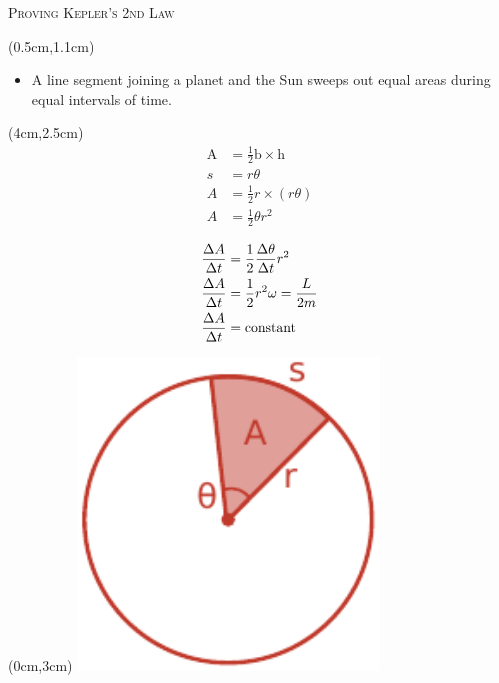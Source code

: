 \documentclass[9pt]{beamer}
\begin{document}
    \begin{frame}{\textsc{Proving Kepler's 2nd Law}}
        \centering
        \begin{textblock*}{10.5cm}(0.5cm,1.1cm)
            \begin{itemize}
                \item A line segment joining a planet and the Sun sweeps out equal areas during equal intervals of time.
            \end{itemize}
        \end{textblock*}

        \begin{textblock*}{10.5cm}(4cm,2.5cm)
            \centering
            \begin{align*}
                \text{A} &= \frac{1}{2}\text{b}\times\text{h} \\        
                s &= r\theta \\
                A&=\frac{1}{2}r\times\left(r\theta\right) \\          
                A&=\frac12 \theta r^2 \\
            \end{align*}
            \begin{align*}
                \frac{\Delta A}{\Delta t} &= \frac{1}{2}\frac{\Delta \theta}{\Delta t}r^2 \\
                \frac{\Delta A}{\Delta t} &= \frac{1}{2}r^2 \omega =\frac{L}{2m}  \\          
                \frac{\Delta A}{\Delta t} &= \rm{constant}
            \end{align*} 
        \end{textblock*}
        
        \begin{textblock*}{8cm}(0cm,3cm)
            \centering
            \includegraphics[width=0.6\textwidth]{assets/areas_proof.pdf}
        \end{textblock*}
    \end{frame}
    
\end{document}
